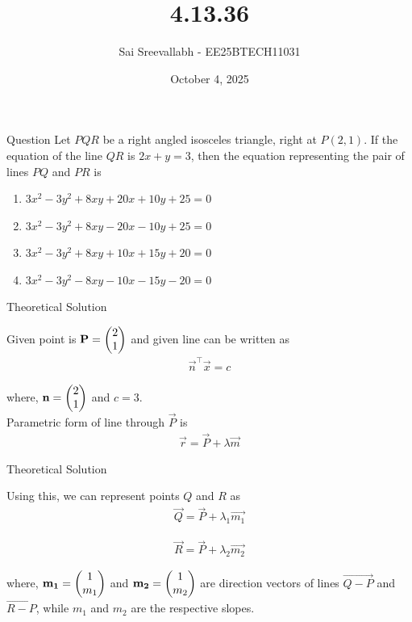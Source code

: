 \documentclass{beamer}
\title{4.13.36}
\author{Sai Sreevallabh - EE25BTECH11031}
\date{October 4, 2025}
\begin{document}
\frame{\titlepage}

\begin{frame}{Question}
Let $PQR$ be a right angled isosceles triangle, right at $P(2, 1)$. If the equation of the line $QR$ is $2x + y = 3$, then the equation representing the pair of lines $PQ$ and $PR$ is \\

\begin{enumerate}
        \item $3x^2 - 3y^2 + 8xy + 20x + 10y + 25 = 0$
        \item $3x^2 - 3y^2 + 8xy - 20x - 10y + 25 = 0$
        \item $3x^2 - 3y^2 + 8xy + 10x + 15y + 20 = 0$
        \item $3x^2 - 3y^2 - 8xy - 10x - 15y - 20 = 0$
\end{enumerate}

\end{frame}

\begin{frame}{Theoretical Solution}

Given point is $\mathbf{P} = \begin{pmatrix}2\\1\end{pmatrix}$ and given line can be written as 
\begin{align}
    \vec{n}^\top\vec{x} = c \label{eq1}
\end{align}

where, $\mathbf{n} = \begin{pmatrix}2\\1\end{pmatrix}$ and $c = 3$.\\

Parametric form of line through $\vec{P}$ is 
\begin{align}
    \vec{r} = \vec{P} + \lambda\vec{m}
\end{align}

\end{frame}

\begin{frame}{Theoretical Solution}

Using this, we can represent points $Q$ and $R$ as
\begin{align}
    \vec{Q} = \vec{P} + \lambda_1\vec{m_1}\label{eq3}
\end{align}

\begin{align}
    \vec{R} = \vec{P} + \lambda_2\vec{m_2} \label{eq4}
\end{align}

where, $\mathbf{m_1} = \begin{pmatrix}1\\m_1\end{pmatrix}$ and $\mathbf{m_2} = \begin{pmatrix}1\\m_2\end{pmatrix}$ are direction vectors of lines $\vec{Q-P}$ and $\vec{R-P}$, while $m_1$ and $m_2$ are the respective slopes.\\

\end{frame}
\end{document}
